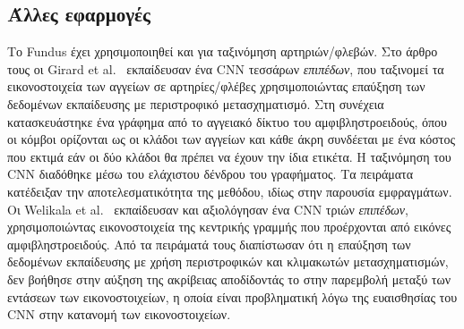\subsection{Άλλες εφαρμογές}
Το Fundus έχει χρησιμοποιηθεί και για ταξινόμηση αρτηριών/φλεβών.
Στο άρθρο τους οι Girard et al.~\cite{girard2017artery} εκπαίδευσαν ένα CNN τεσσάρων \textit{επιπέδων}, που ταξινομεί τα εικονοστοιχεία των αγγείων σε αρτηρίες/φλέβες χρησιμοποιώντας επαύξηση των δεδομένων εκπαίδευσης με περιστροφικό μετασχηματισμό.
Στη συνέχεια κατασκευάστηκε ένα γράφημα από το αγγειακό δίκτυο του αμφιβληστροειδούς, όπου οι κόμβοι ορίζονται ως οι κλάδοι των αγγείων και κάθε άκρη συνδέεται με ένα κόστος που εκτιμά εάν οι δύο κλάδοι θα πρέπει να έχουν την ίδια ετικέτα.
Η ταξινόμηση του CNN διαδόθηκε μέσω του ελάχιστου δένδρου του γραφήματος.
Τα πειράματα κατέδειξαν την αποτελεσματικότητα της μεθόδου, ιδίως στην παρουσία εμφραγμάτων.
Οι Welikala et al.~\cite{welikala2017automated} εκπαίδευσαν και αξιολόγησαν ένα CNN τριών \textit{επιπέδων}, χρησιμοποιώντας εικονοστοιχεία της κεντρικής γραμμής που προέρχονται από εικόνες αμφιβληστροειδούς.
Από τα πειράματά τους διαπίστωσαν ότι η επαύξηση των δεδομένων εκπαίδευσης με χρήση περιστροφικών και κλιμακωτών μετασχηματισμών, δεν βοήθησε στην αύξηση της ακρίβειας αποδίδοντάς το στην παρεμβολή μεταξύ των εντάσεων των εικονοστοιχείων, η οποία είναι προβληματική λόγω της ευαισθησίας του CNN στην κατανομή των εικονοστοιχείων.

